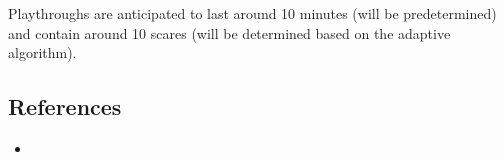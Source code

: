 \documentclass[12pt,a4paper]{article}
\begin{document}
Playthroughs are anticipated to last around 10 minutes (will be predetermined) and contain around 10 scares (will be determined based on the adaptive algorithm).

\subsection{References}



	\begin{itemize}
		\item
	\end{itemize}


\end{document}
